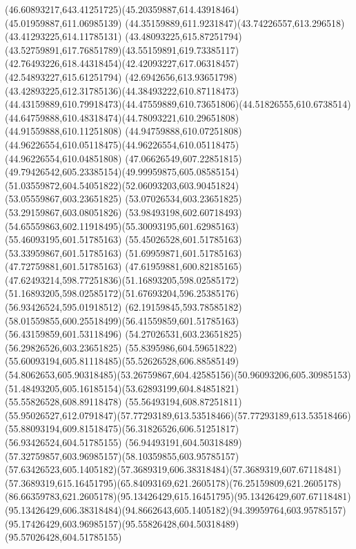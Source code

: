 {{	\curveto(46.60893217,643.41251725)(45.20359887,614.43918464)(45.01959887,611.06985139)
	\curveto(44.35159889,611.9231847)(43.74226557,613.296518)(43.41293225,614.11785131)
	\curveto(43.48093225,615.87251794)(43.52759891,617.76851789)(43.55159891,619.73385117)
	\curveto(42.76493226,618.44318454)(42.42093227,617.06318457)(42.54893227,615.61251794)
	\curveto(42.6942656,613.93651798)(43.42893225,612.31785136)(44.38493222,610.87118473)
	\curveto(44.43159889,610.79918473)(44.47559889,610.73651806)(44.51826555,610.6738514)
	\curveto(44.64759888,610.48318474)(44.78093221,610.29651808)(44.91559888,610.11251808)
	\curveto(44.94759888,610.07251808)(44.96226554,610.05118475)(44.96226554,610.05118475)
	\lineto(44.96226554,610.04851808)
	\curveto(47.06626549,607.22851815)(49.79426542,605.23385154)(49.99959875,605.08585154)
	\curveto(51.03559872,604.54051822)(52.06093203,603.90451824)(53.05559867,603.23651825)
	\lineto(53.07026534,603.23651825)
	\lineto(53.29159867,603.08051826)
	\curveto(53.98493198,602.60718493)(54.65559863,602.11918495)(55.30093195,601.62985163)
	\lineto(55.46093195,601.51785163)
	\lineto(55.45026528,601.51785163)
	\lineto(53.33959867,601.51785163)
	\lineto(51.69959871,601.51785163)
	\lineto(47.72759881,601.51785163)
	\curveto(47.61959881,600.82185165)(47.62493214,598.77251836)(51.16893205,598.02585172)
	\curveto(51.16893205,598.02585172)(51.67693204,596.25385176)(56.93426524,595.01918512)
	\curveto(62.19159845,593.78585182)(58.01559855,600.25518499)(56.41559859,601.51785163)
	\lineto(56.43159859,601.53118496)
	\lineto(54.27026531,603.23651825)
	\lineto(56.29826526,603.23651825)
	\curveto(55.8395986,604.59651822)(55.60093194,605.81118485)(55.52626528,606.88585149)
	\curveto(54.8062653,605.90318485)(53.26759867,604.42585156)(50.96093206,605.30985153)
	\curveto(51.48493205,605.16185154)(53.62893199,604.84851821)(55.55826528,608.89118478)
	\lineto(55.56493194,608.87251811)
	\curveto(55.95026527,612.0791847)(57.77293189,613.53518466)(57.77293189,613.53518466)
	\curveto(55.88093194,609.81518475)(56.31826526,606.51251817)(56.93426524,604.51785155)
	\curveto(56.94493191,604.50318489)(57.32759857,603.96985157)(58.10359855,603.95785157)
	\curveto(57.63426523,605.1405182)(57.3689319,606.38318484)(57.3689319,607.67118481)
	\curveto(57.3689319,615.16451795)(65.84093169,621.2605178)(76.25159809,621.2605178)
	\curveto(86.66359783,621.2605178)(95.13426429,615.16451795)(95.13426429,607.67118481)
	\curveto(95.13426429,606.38318484)(94.8662643,605.1405182)(94.39959764,603.95785157)
	\curveto(95.17426429,603.96985157)(95.55826428,604.50318489)(95.57026428,604.51785155)
}}
